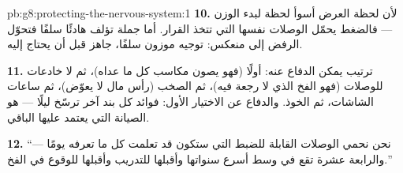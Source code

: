 \begin{solution}{pb:g8:protecting-the-nervous-system:1}
\textbf{10.} لأن لحظة العرض أسوأ لحظة لبدء الوزن ---
فالضغط يحمّل الوصلات نفسها التي تتخذ القرار. أما جملة
تؤلف هادئًا سلفًا فتحوّل الرفض إلى منعكس: توجيه موزون
سلفًا، جاهز قبل أن يحتاج إليه.

\textbf{11.} ترتيب يمكن الدفاع عنه:  أولًا (فهو
يصون مكاسب كل ما عداه)، ثم لا خادعات للوصلات (فهو الفخ
الذي لا رجعة فيه)، ثم الصخب (رأس مال لا يعوّض)، ثم
ساعات الشاشات، ثم الخوذ. والدفاع عن الاختيار الأول:
فوائد كل بند آخر ترسّخ ليلًا ---  هو الصيانة التي
يعتمد عليها الباقي.

\textbf{12.} ``نحن نحمي الوصلات القابلة للضبط التي
ستكون قد تعلمت كل ما تعرفه يومًا --- والرابعة عشرة تقع
في وسط أسرع سنواتها وأقبلها للتدريب وأقبلها للوقوع في
الفخ.''
\end{solution}
